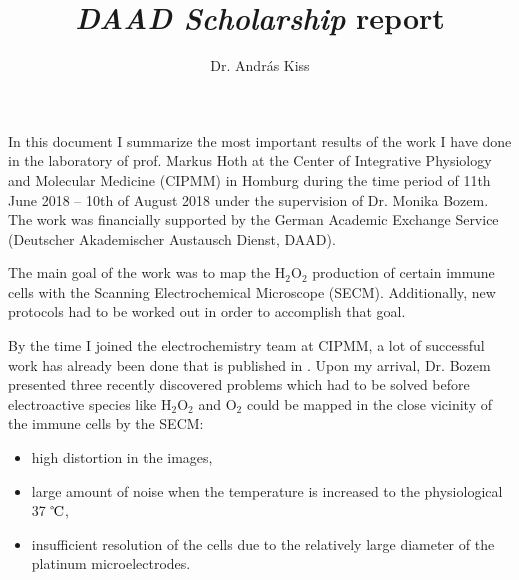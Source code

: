 \documentclass[a4paper, 11pt, oneside, bibliography=totoc]{article}
\begin{document}
\title{\emph{DAAD Scholarship} report}
\author{Dr. András Kiss}
\maketitle

In this document I summarize the most important results of the work I have done in the laboratory of prof. Markus Hoth at the Center of Integrative Physiology and Molecular Medicine (CIPMM) in Homburg during the time period of 11th June 2018 -- 10th of August 2018 under the supervision of Dr. Monika Bozem. The work was financially supported by the German Academic Exchange Service (Deutscher Akademischer Austausch Dienst, DAAD).

The main goal of the work was to map the H$_2$O$_2$ production of certain immune cells with the Scanning Electrochemical Microscope (SECM). Additionally, new protocols had to be worked out in order to accomplish that goal. 


By the time I joined the electrochemistry team at CIPMM, a lot of successful work has already been done that is published in \cite{bozem2018electrochemical}. Upon my arrival, Dr. Bozem presented three recently discovered problems which had to be solved before electroactive species like H$_2$O$_2$ and O$_2$ could be mapped in the close vicinity of the immune cells by the SECM:
 
\begin{itemize}
\item high distortion in the images,
\item large amount of noise when the temperature is increased to the physiological 37 $\celsius$,
\item insufficient resolution of the cells due to the relatively large diameter of the platinum microelectrodes.
\end{itemize}
\end{document}
